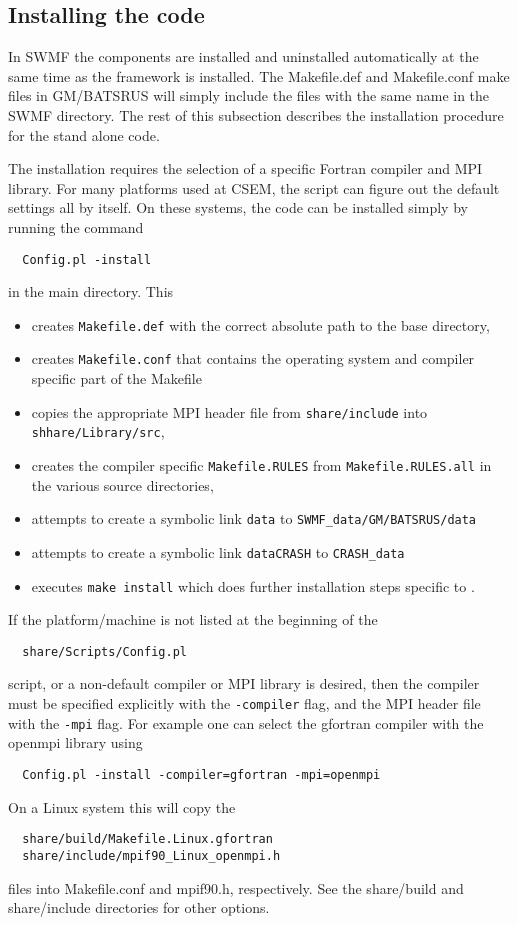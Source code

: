 \subsection{Installing the code}

In SWMF the components are installed and uninstalled automatically 
at the same time as the framework is installed.
The Makefile.def and Makefile.conf make files in GM/BATSRUS will 
simply include the files with the same name in the SWMF directory.
The rest of this subsection describes the installation procedure
for the stand alone code.
 
The installation requires the selection of a specific Fortran compiler and
MPI library. For many platforms used at CSEM,
the script can figure out the default settings all by itself. 
On these systems, the code can be installed simply by running the command
\begin{verbatim}
  Config.pl -install
\end{verbatim}
in the main directory. This
\begin{itemize}
\item creates {\tt Makefile.def} with the correct 
      absolute path to the base directory, 
\item creates {\tt Makefile.conf} that contains the operating 
      system and compiler specific part of the Makefile
\item copies the appropriate MPI header file from 
      {\tt share/include} into {\tt shhare/Library/src},
\item creates the compiler specific {\tt Makefile.RULES} from
      {\tt Makefile.RULES.all} in the various source directories,
\item attempts to create a symbolic link {\tt data} to {\tt SWMF\_data/GM/BATSRUS/data}
\item attempts to create a symbolic link {\tt dataCRASH} to {\tt CRASH\_data}
\item executes {\tt make install} which does further
      installation steps specific to \BATSRUS. 
\end{itemize}
If the platform/machine is not listed at the beginning of the
\begin{verbatim}
  share/Scripts/Config.pl
\end{verbatim}
script, or a non-default compiler or MPI library is desired,
then the compiler must be specified explicitly with the 
{\tt -compiler} flag, and the MPI header file with the {\tt -mpi} flag. 
For example one can select the gfortran compiler with the openmpi library using
\begin{verbatim}
  Config.pl -install -compiler=gfortran -mpi=openmpi
\end{verbatim}
On a Linux system this will copy the
\begin{verbatim}
  share/build/Makefile.Linux.gfortran
  share/include/mpif90_Linux_openmpi.h
\end{verbatim}
files into Makefile.conf and mpif90.h, respectively. See the share/build and share/include
directories for other options.

